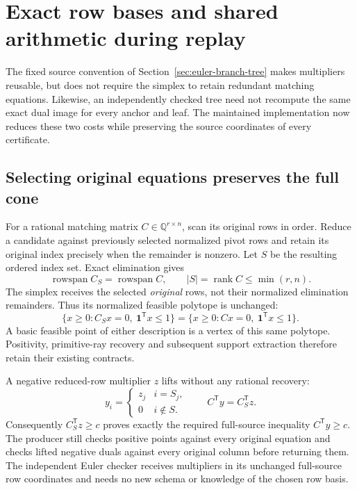\section{Exact row bases and shared arithmetic during replay}
\label{sec:euler-rank-replay}

The fixed source convention of Section~\ref{sec:euler-branch-tree} makes
multipliers reusable, but does not require the simplex to retain redundant
matching equations.  Likewise, an independently checked tree need not
recompute the same exact dual image for every anchor and leaf.  The maintained
implementation now reduces these two costs while preserving the source
coordinates of every certificate.

\subsection{Selecting original equations preserves the full cone}

For a rational matching matrix $C\in\mathbb Q^{r\times n}$, scan its original
rows in order.  Reduce a candidate against previously selected normalized
pivot rows and retain its original index precisely when the remainder is
nonzero.  Let $S$ be the resulting ordered index set.  Exact elimination gives
\[
 \operatorname{rowspan} C_S=\operatorname{rowspan} C,\qquad
 |S|=\operatorname{rank} C\le\min(r,n).
\]
The simplex receives the selected \emph{original} rows, not their normalized
elimination remainders.  Thus its normalized feasible polytope is unchanged:
\[
 \{x\ge0:C_Sx=0,\ \boldsymbol1^{\mathsf T}x\le1\}
 =\{x\ge0:Cx=0,\ \boldsymbol1^{\mathsf T}x\le1\}.
\]
A basic feasible point of either description is a vertex of this same
polytope.  Positivity, primitive-ray recovery and subsequent support
extraction therefore retain their existing contracts.

A negative reduced-row multiplier $z$ lifts without any rational recovery:
\[
 y_i=\begin{cases}z_j&i=S_j,\\0&i\notin S.\end{cases}
 \qquad C^{\mathsf T}y=C_S^{\mathsf T}z.
\]
Consequently $C_S^{\mathsf T}z\ge c$ proves exactly the required full-source
inequality $C^{\mathsf T}y\ge c$.  The producer still checks positive points
against every original equation and checks lifted negative duals against
every original column before returning them.  The independent Euler checker
receives multipliers in its unchanged full-source row coordinates and needs
no new schema or knowledge of the chosen row basis.

